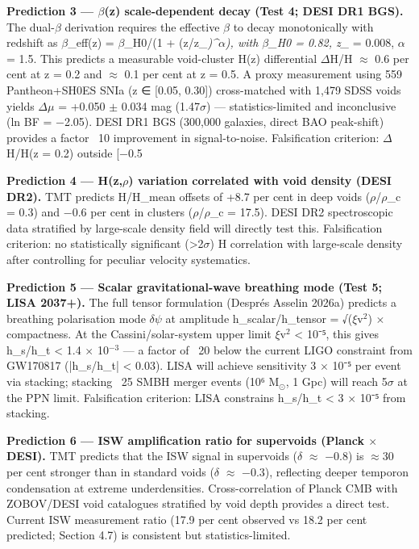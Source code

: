 \documentclass[a4paper,fleqn,usenatbib]{mnras}
\begin{document}
\textbf{Prediction 3 — $\beta$(z) scale-dependent decay (Test 4; DESI DR1 BGS).}
The dual-$\beta$ derivation requires the effective $\beta$ to decay monotonically with redshift as $\beta$_eff(z) = $\beta$_H0/(1 + (z/z_\textit{)^$\alpha$), with $\beta$_H0 = 0.82, z_} = 0.008, $\alpha$ = 1.5. This predicts a measurable void-cluster H(z) differential $\Delta$H/H $\approx$ 0.6 per cent at z = 0.2 and $\approx$ 0.1 per cent at z = 0.5. A proxy measurement using 559 Pantheon+SH0ES SNIa (z ∈ [0.05, 0.30]) cross-matched with 1,479 SDSS voids yields $\Delta$$\mu$ = +0.050 $\pm$ 0.034 mag (1.47$\sigma$) — statistics-limited and inconclusive (ln BF = −2.05). DESI DR1 BGS (300,000 galaxies, direct BAO peak-shift) provides a factor ~10 improvement in signal-to-noise. Falsification criterion: $\Delta$H/H(z = 0.2) outside [−0.5%

\textbf{Prediction 4 — H(z,$\rho$) variation correlated with void density (DESI DR2).}
TMT predicts H/H_mean offsets of +8.7 per cent in deep voids ($\rho$/$\rho$_c = 0.3) and −0.6 per cent in clusters ($\rho$/$\rho$_c = 17.5). DESI DR2 spectroscopic data stratified by large-scale density field will directly test this. Falsification criterion: no statistically significant (>2$\sigma$) H correlation with large-scale density after controlling for peculiar velocity systematics.

\textbf{Prediction 5 — Scalar gravitational-wave breathing mode (Test 5; LISA 2037+).}
The full tensor formulation (Després Asselin 2026a) predicts a breathing polarisation mode $\delta$$\psi$ at amplitude h_scalar/h_tensor = √($\xi$v$^{2}$) $\times$ compactness. At the Cassini/solar-system upper limit $\xi$v$^{2}$ < 10⁻⁵, this gives h_s/h_t < 1.4 $\times$ 10$^{-3}$ — a factor of ~20 below the current LIGO constraint from GW170817 (|h_s/h_t| < 0.03). LISA will achieve sensitivity 3 $\times$ 10⁻⁵ per event via stacking; stacking ~25 SMBH merger events (10⁶ M$_\odot$, 1 Gpc) will reach 5$\sigma$ at the PPN limit. Falsification criterion: LISA constrains h_s/h_t < 3 $\times$ 10⁻⁵ from stacking.

\textbf{Prediction 6 — ISW amplification ratio for supervoids (Planck $\times$ DESI).}
TMT predicts that the ISW signal in supervoids ($\delta$ $\approx$ −0.8) is $\approx$30 per cent stronger than in standard voids ($\delta$ $\approx$ −0.3), reflecting deeper temporon condensation at extreme underdensities. Cross-correlation of Planck CMB with ZOBOV/DESI void catalogues stratified by void depth provides a direct test. Current ISW measurement ratio (17.9 per cent observed vs 18.2 per cent predicted; Section 4.7) is consistent but statistics-limited.
\end{document}
